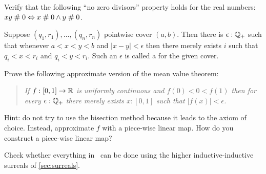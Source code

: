 \begin{ex} \label{ex:reals-apart-zero-divisors}
  Verify that the following ``no zero divisors'' property holds for the real numbers:
  $x y \mathrel{\#} 0 \Leftrightarrow x \mathrel{\#} 0 \land y \mathrel{\#} 0$.
\end{ex}

\begin{ex} \label{ex:finite-cover-lebesgue-number}
  Suppose $(q_1, r_1), \ldots, (q_n, r_n)$ pointwise cover $(a, b)$. Then there is
  $\epsilon : \mathbb{Q}_{+}$ such that whenever $a < x < y < b$ and $|x - y| < \epsilon$
  then there merely exists $i$ such that $q_i < x < r_i$ and $q_i < y < r_i$. Such an
  $\epsilon$ is called a  for the given cover.
\end{ex}

\begin{ex} \label{ex:mean-value-theorem}
  Prove the following approximate version of the mean value theorem:
  \begin{quote}
    \emph{
      If $f : [0,1] \to \mathbb{R}$ is uniformly continuous and $f(0) < 0 < f(1)$ then
      for every $\epsilon : \mathbb{Q}_{+}$ there merely exists $x : [0,1]$ such that $|f(x)| <
      \epsilon$.
    }
  \end{quote}
  Hint: do not try to use the bisection method because it leads to the axiom of choice.
  Instead, approximate $f$ with a piece-wise linear map. How do you construct a piece-wise
  linear map?
\end{ex}

\begin{ex}
  Check whether everything in~\cite{knuth74:_surreal_number} can be done using the higher
  inductive-inductive surreals of \autoref{sec:surreals}.
\end{ex}


